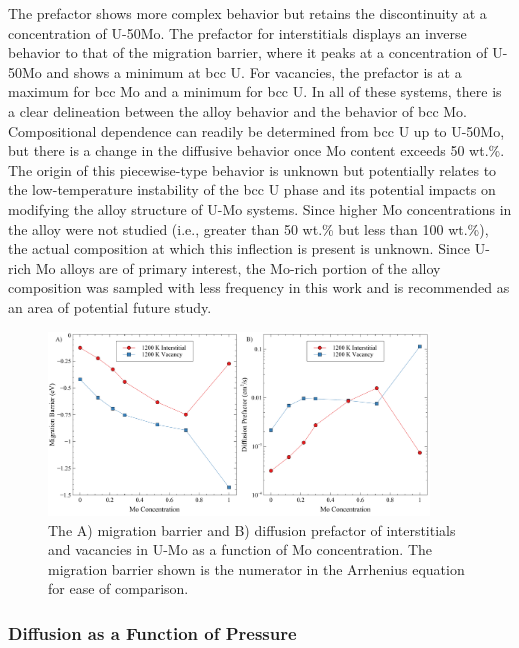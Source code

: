 \documentclass[review]{elsarticle}
\begin{document}
The prefactor shows more complex behavior but retains the discontinuity at a concentration of U-50Mo. The prefactor for interstitials displays an inverse behavior to that of the migration barrier, where it peaks at a concentration of U-50Mo and shows a minimum at bcc U. For vacancies, the prefactor is at a maximum for bcc Mo and a minimum for bcc U. In all of these systems, there is a clear delineation between the alloy behavior and the behavior of bcc Mo. Compositional dependence can readily be determined from bcc U up to U-50Mo, but there is a change in the diffusive behavior once Mo content exceeds 50 wt.\%. The origin of this piecewise-type behavior is unknown but potentially relates to the low-temperature instability of the bcc U phase and its potential impacts on modifying the alloy structure of U-Mo systems. Since higher Mo concentrations in the alloy were not studied (i.e., greater than 50 wt.\% but less than 100 wt.\%), the actual composition at which this inflection is present is unknown. Since U-rich Mo alloys are of primary interest, the Mo-rich portion of the alloy composition was sampled with less frequency in this work and is recommended as an area of potential future study. 

\begin{figure}[h!]
    \centering
    \includegraphics[width=0.9\textwidth]{Em_D0.pdf}
    \caption{The A) migration barrier and B) diffusion prefactor of interstitials and vacancies in U-Mo as a function of Mo concentration. The migration barrier shown is the numerator in the Arrhenius equation for ease of comparison.}
    \label{fig:Em_D0}
\end{figure}

\FloatBarrier

\subsubsection{Diffusion as a Function of Pressure}
\end{document}
